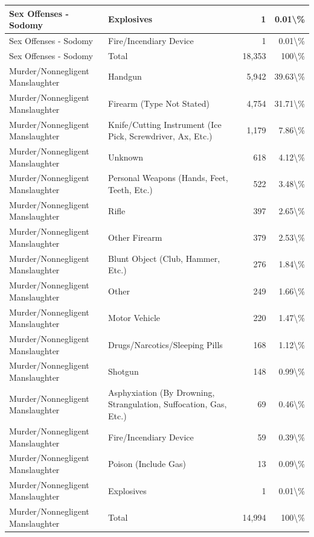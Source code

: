 \documentclass[
]{krantz}
\begin{document}
\begin{longtable}[t]{l|l|r|r}
\hline
Sex Offenses - Sodomy & Explosives & 1 & 0.01\textbackslash{}\%\\
\hline
Sex Offenses - Sodomy & Fire/Incendiary Device & 1 & 0.01\textbackslash{}\%\\
\hline
Sex Offenses - Sodomy & Total & 18,353 & 100\textbackslash{}\%\\
\hline
Murder/Nonnegligent Manslaughter & Handgun & 5,942 & 39.63\textbackslash{}\%\\
\hline
Murder/Nonnegligent Manslaughter & Firearm (Type Not Stated) & 4,754 & 31.71\textbackslash{}\%\\
\hline
Murder/Nonnegligent Manslaughter & Knife/Cutting Instrument (Ice Pick, Screwdriver, Ax, Etc.) & 1,179 & 7.86\textbackslash{}\%\\
\hline
Murder/Nonnegligent Manslaughter & Unknown & 618 & 4.12\textbackslash{}\%\\
\hline
Murder/Nonnegligent Manslaughter & Personal Weapons (Hands, Feet, Teeth, Etc.) & 522 & 3.48\textbackslash{}\%\\
\hline
Murder/Nonnegligent Manslaughter & Rifle & 397 & 2.65\textbackslash{}\%\\
\hline
Murder/Nonnegligent Manslaughter & Other Firearm & 379 & 2.53\textbackslash{}\%\\
\hline
Murder/Nonnegligent Manslaughter & Blunt Object (Club, Hammer, Etc.) & 276 & 1.84\textbackslash{}\%\\
\hline
Murder/Nonnegligent Manslaughter & Other & 249 & 1.66\textbackslash{}\%\\
\hline
Murder/Nonnegligent Manslaughter & Motor Vehicle & 220 & 1.47\textbackslash{}\%\\
\hline
Murder/Nonnegligent Manslaughter & Drugs/Narcotics/Sleeping Pills & 168 & 1.12\textbackslash{}\%\\
\hline
Murder/Nonnegligent Manslaughter & Shotgun & 148 & 0.99\textbackslash{}\%\\
\hline
Murder/Nonnegligent Manslaughter & Asphyxiation (By Drowning, Strangulation, Suffocation, Gas, Etc.) & 69 & 0.46\textbackslash{}\%\\
\hline
Murder/Nonnegligent Manslaughter & Fire/Incendiary Device & 59 & 0.39\textbackslash{}\%\\
\hline
Murder/Nonnegligent Manslaughter & Poison (Include Gas) & 13 & 0.09\textbackslash{}\%\\
\hline
Murder/Nonnegligent Manslaughter & Explosives & 1 & 0.01\textbackslash{}\%\\
\hline
Murder/Nonnegligent Manslaughter & Total & 14,994 & 100\textbackslash{}\%\\

\end{longtable}
\end{document}
